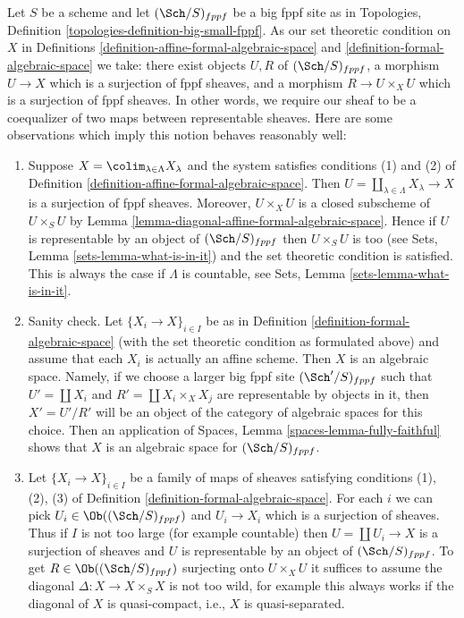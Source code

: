 \begin{remark}
\label{remark-set-theoretic}
Let $S$ be a scheme and let $(\Sch/S)_{fppf}$ be a big fppf site as
in Topologies, Definition \ref{topologies-definition-big-small-fppf}.
As our set theoretic condition on $X$ in
Definitions \ref{definition-affine-formal-algebraic-space} and
\ref{definition-formal-algebraic-space} we take:
there exist objects $U, R$ of $(\Sch/S)_{fppf}$, a
morphism $U \to X$ which is a surjection of fppf sheaves, and
a morphism $R \to U \times_X U$ which is a surjection of fppf sheaves.
In other words, we require our sheaf to be a coequalizer of
two maps between representable sheaves.
Here are some observations which imply this notion behaves
reasonably well:
\begin{enumerate}
\item Suppose $X = \colim_{\lambda \in \Lambda} X_\lambda$
and the system satisfies conditions (1) and (2) of
Definition \ref{definition-affine-formal-algebraic-space}. Then
$U = \coprod_{\lambda \in \Lambda} X_\lambda \to X$ is a surjection
of fppf sheaves. Moreover, $U \times_X U$ is a closed subscheme
of $U \times_S U$ by Lemma \ref{lemma-diagonal-affine-formal-algebraic-space}.
Hence if $U$ is representable by an object of $(\Sch/S)_{fppf}$
then $U \times_S U$ is too (see Sets, Lemma \ref{sets-lemma-what-is-in-it})
and the set theoretic condition is satisfied. This is always the case
if $\Lambda$ is countable, see Sets, Lemma \ref{sets-lemma-what-is-in-it}.
\item Sanity check. Let $\{X_i \to X\}_{i \in I}$ be as in
Definition \ref{definition-formal-algebraic-space}
(with the set theoretic condition as formulated above)
and assume that each $X_i$ is actually an affine scheme.
Then $X$ is an algebraic space. Namely, if we choose a larger
big fppf site $(\Sch'/S)_{fppf}$ such that $U' = \coprod X_i$
and $R' = \coprod X_i \times_X X_j$ are representable by objects
in it, then $X' = U'/R'$ will be an object of the category
of algebraic spaces for this choice. Then an application of
Spaces, Lemma \ref{spaces-lemma-fully-faithful} shows that
$X$ is an algebraic space for $(\Sch/S)_{fppf}$.
\item Let $\{X_i \to X\}_{i \in I}$ be a family of maps of sheaves
satisfying conditions (1), (2), (3) of
Definition \ref{definition-formal-algebraic-space}.
For each $i$ we can pick $U_i \in \Ob((\Sch/S)_{fppf})$
and $U_i \to X_i$ which is a surjection of sheaves.
Thus if $I$ is not too large (for example countable) then
$U = \coprod U_i \to X$ is a surjection of sheaves and
$U$ is representable by an object of $(\Sch/S)_{fppf}$.
To get $R \in \Ob((\Sch/S)_{fppf})$ surjecting onto $U \times_X U$
it suffices to assume the diagonal $\Delta : X \to X \times_S X$ is not
too wild, for example this always works if the diagonal of $X$ is
quasi-compact, i.e., $X$ is quasi-separated.
\end{enumerate}
\end{remark}







